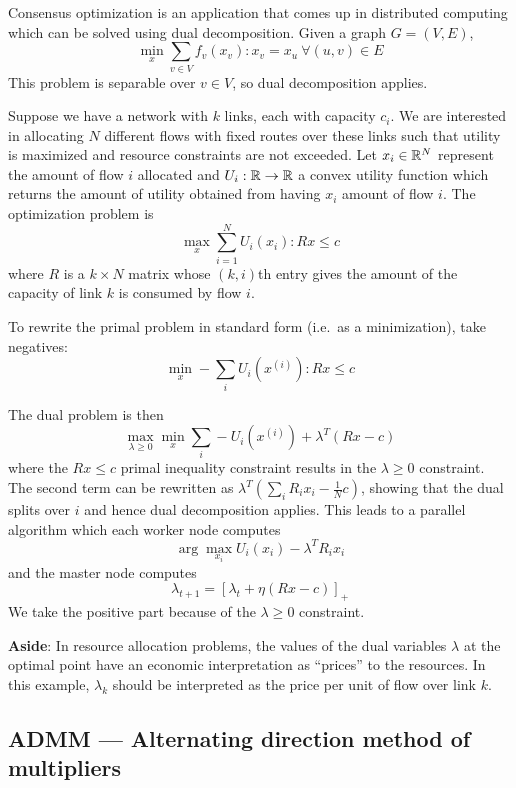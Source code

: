 \begin{example}
Consensus optimization is an
application that comes up in distributed computing which can be solved
using dual decomposition. Given a graph $G = (V, E)$,
\[
\min_x \sum_{v \in V} f_v(x_v) : x_v = x_u~\forall(u,v) \in E
\]
This problem is separable over $v \in V$, so dual decomposition applies.

\end{example}

\begin{example}
Suppose we have a
network with $k$ links, each with capacity $c_i$. We are interested
in allocating $N$ different flows with fixed routes over these links such that
utility is maximized and resource constraints are not exceeded.
Let $x_i \in \mathbb{R}^N$ represent the amount of flow $i$ allocated and
$U_i : \mathbb{R} \to \mathbb{R}$ a convex utility function which
returns the amount of utility obtained from having $x_i$ amount of
flow $i$. The optimization problem is
\[
\max_x \sum_{i=1}^N U_i(x_i) : R x \leq c
\]
where $R$ is a $k \times N$ matrix whose $(k,i)$th entry gives the
amount of the capacity of link $k$ is consumed by flow $i$.

To rewrite the primal problem in standard form (i.e.~as a minimization),
take negatives:
\[
\min_x -\sum_i U_i(x^{(i)}) : R x \leq c
\]

The dual problem is then
\[
\max_{\lambda \geq 0} \min_x \sum_i -U_i(x^{(i)}) + \lambda^T (R x - c)
\]
where the $R x \leq c$ primal inequality constraint results in the $\lambda \geq 0$ constraint.
The second term can be rewritten as $\lambda^T\left(\sum_i R_i x_i - \frac{1}{N}c\right)$,
showing that the dual splits over $i$ and hence dual decomposition applies. This leads to a
parallel algorithm which each worker node computes
\[
\arg\max_{x_i} U_i(x_i) - \lambda^T R_i x_i
\]
and the master node computes
\[
\lambda_{t+1} = \left[\lambda_t + \eta (R x - c)\right]_+
\]
We take the positive part because of the $\lambda \geq 0$ constraint.

\textbf{Aside}: In resource allocation problems, the values of the dual variables
$\lambda$ at the optimal point have an economic interpretation as
``prices'' to the resources. In this example, $\lambda_k$ should be
interpreted as the price per unit of flow over link $k$.
\end{example}

\subsection{ADMM --- Alternating direction method of multipliers}

